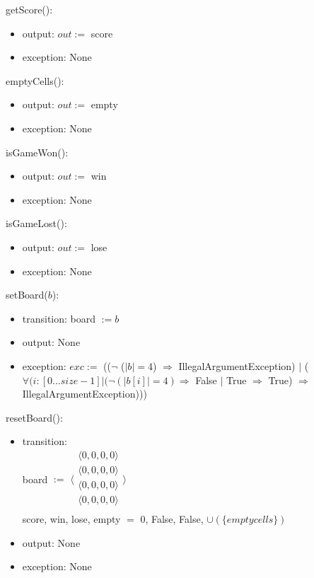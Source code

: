 \documentclass[12pt]{article}
\begin{document}
\noindent getScore():
\begin{itemize}
\item output: $out :=$ score
\item exception: None
\end{itemize}

\noindent emptyCells():
\begin{itemize}
\item output: $out :=$ empty
\item exception: None
\end{itemize}

\noindent isGameWon():
\begin{itemize}
\item output: $out :=$ win
\item exception: None
\end{itemize}

\noindent isGameLost():
\begin{itemize}
\item output: $out :=$ lose
\item exception: None
\end{itemize}

\noindent setBoard($b$):
\begin{itemize}
  \item transition: board $:= b$ 
  \item output: None
  \item exception: $exc :=$ (($\neg$ ($|b| = 4$) 
  $\Rightarrow$ IllegalArgumentException) $|$ 
  ($\forall(i : [0...size-1]| (\neg (|b[i]| = 4) \Rightarrow$ False $|$ True $\Rightarrow$ True) 
  $\Rightarrow$ IllegalArgumentException)))
\end{itemize}

\noindent resetBoard():
\begin{itemize}
\item transition: \\
      board $:=$ 
      $\langle \begin{array}{c}
      \langle 0, 0, 0, 0 \rangle\\
      \langle 0, 0, 0, 0 \rangle\\
      \langle 0, 0, 0, 0 \rangle\\
      \langle 0, 0, 0, 0 \rangle\\
      \end{array} \rangle$ \\ 
      score, win, lose, empty $=$ 0, False, False, $\cup (\{empty cells\})$
\item output: None
\item exception: None
\end{itemize}
\end{document}
